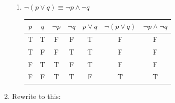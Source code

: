 \documentclass[letterpaper]{article}
\begin{document}
\begin{enumerate}
\begin{enumerate}
            \item $\neg (p \lor q) \equiv \neg p \land \neg q$

            \begin{tabular}{|c|c|c|c|c|c|c|}
                \hline
                $p$ & $q$ & $\neg p$ & $\neg q$ & $p \lor q$ & $\neg(p \lor q)$ & $\neg p \land \neg q$ \\ \hline
                T & T & F & F & T & F & F\\ \hline
                T & F & F & T & T & F & F\\ \hline
                F & T & T & F & T & F & F\\ \hline
                F & F & T & T & F & T & T\\ \hline
            \end{tabular}

            
        \end{enumerate}

        \item Rewrite to this:

        
    \end{enumerate}

    
\end{document}
